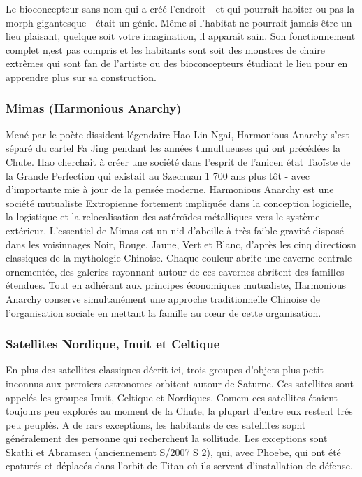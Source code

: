                                                                      Le bioconcepteur sans nom qui a créé l'endroit - et qui pourrait habiter ou pas la morph gigantesque - était un génie. Même si l'habitat ne pourrait jamais être un lieu plaisant, quelque soit votre imagination, il apparaît sain. Son fonctionnement complet n,est pas compris et les habitants sont soit des monstres de chaire extrêmes qui sont fan de l'artiste ou des bioconcepteurs étudiant le lieu pour en apprendre plus sur sa construction. 

                                                                     \subsubsection{Mimas (Harmonious Anarchy)} \label{sec:mimas-harm-anarchy} 

                                                                     Mené par le poète dissident légendaire Hao Lin Ngai, Harmonious Anarchy s'est séparé du cartel Fa Jing pendant les années tumultueuses qui ont précédées la Chute. Hao cherchait à créer une société dans l'esprit de l'anicen état Taoïste de la Grande Perfection qui existait au Szechuan 1 700 ans plus tôt - avec d'importante mie à jour de la pensée moderne. Harmonious Anarchy est une société mutualiste Extropienne fortement impliquée dans la conception logicielle, la logistique et la relocalisation des astéroïdes métalliques vers le système extérieur. L'essentiel de Mimas est un nid d'abeille à très faible gravité disposé dans les voisinnages Noir, Rouge, Jaune, Vert et Blanc, d'après les cinq directiosn classiques de la mythologie Chinoise. Chaque couleur abrite une caverne centrale ornementée, des galeries rayonnant autour de ces cavernes abritent des familles étendues. Tout en adhérant aux principes économiques mutualiste, Harmonious Anarchy conserve simultanément une approche traditionnelle Chinoise de l'organisation sociale en mettant la famille au cœur de cette organisation. 

                                                                     \subsubsection{Satellites Nordique, Inuit et Celtique} \label{sec:norse-inuit-gallic} 

                                                                     En plus des satellites classiques décrit ici, trois groupes d'objets plus petit inconnus aux premiers astronomes orbitent autour de Saturne. Ces satellites sont appelés les groupes Inuit, Celtique et Nordiques. Comem ces satellites étaient toujours peu explorés au moment de la Chute, la plupart d'entre eux restent trés peu peuplés. A de rars exceptions, les habitants de ces satellites sopnt généralement des personne qui recherchent la sollitude. Les exceptions sont Skathi et Abramsen (anciennement S/2007 S 2), qui, avec Phoebe, qui ont été cpaturés et déplacés dans l'orbit de Titan où ils servent d'installation de défense. 

